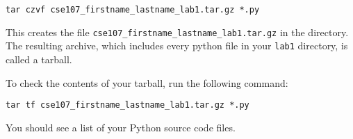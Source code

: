 \documentclass[12pt,hidelinks]{article}
\begin{document}
\begin{lstlisting}[style=bash]
tar czvf cse107_firstname_lastname_lab1.tar.gz *.py
\end{lstlisting}

This creates the file \texttt{cse107\_firstname\_lastname\_lab1.tar.gz} in the directory. The resulting archive, which includes every python file in your \texttt{lab1} directory, is called a tarball. 

To check the contents of your tarball, run the following command:

\begin{lstlisting}[style=bash]
tar tf cse107_firstname_lastname_lab1.tar.gz *.py
\end{lstlisting}

You should see a list of your Python source code files.


\pagebreak
\end{document}
